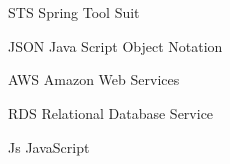 \newpage
\chapter*{\abbreviationName}
\vspace{-0.3em}


\begin{abbrv}
\item[STS]                   Spring Tool Suit
\item[JSON]					 Java Script Object Notation
\item[AWS]					 Amazon Web Services
\item[RDS]				     Relational Database Service
\item[Js]					 JavaScript

\end{abbrv}